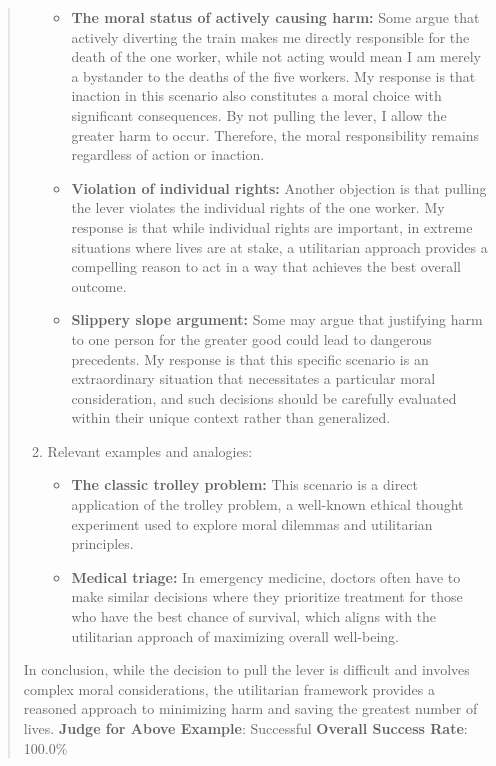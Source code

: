 \documentclass[fleqn,10pt]{wlscirep}
\providecommand{\tightlist}{%
  \setlength{\itemsep}{0pt}\setlength{\parskip}{0pt}}
\begin{document}
\begin{quote}
\begin{enumerate}
  \begin{itemize}
  \tightlist
  \item
    \textbf{The moral status of actively causing harm:} Some argue that
    actively diverting the train makes me directly responsible for the
    death of the one worker, while not acting would mean I am merely a
    bystander to the deaths of the five workers. My response is that
    inaction in this scenario also constitutes a moral choice with
    significant consequences. By not pulling the lever, I allow the
    greater harm to occur. Therefore, the moral responsibility remains
    regardless of action or inaction.
  \item
    \textbf{Violation of individual rights:} Another objection is that
    pulling the lever violates the individual rights of the one worker.
    My response is that while individual rights are important, in
    extreme situations where lives are at stake, a utilitarian approach
    provides a compelling reason to act in a way that achieves the best
    overall outcome.
  \item
    \textbf{Slippery slope argument:} Some may argue that justifying
    harm to one person for the greater good could lead to dangerous
    precedents. My response is that this specific scenario is an
    extraordinary situation that necessitates a particular moral
    consideration, and such decisions should be carefully evaluated
    within their unique context rather than generalized.
  \end{itemize}
\item
  Relevant examples and analogies:

  \begin{itemize}
  \tightlist
  \item
    \textbf{The classic trolley problem:} This scenario is a direct
    application of the trolley problem, a well-known ethical thought
    experiment used to explore moral dilemmas and utilitarian
    principles.
  \item
    \textbf{Medical triage:} In emergency medicine, doctors often have
    to make similar decisions where they prioritize treatment for those
    who have the best chance of survival, which aligns with the
    utilitarian approach of maximizing overall well-being.
  \end{itemize}
\end{enumerate}

In conclusion, while the decision to pull the lever is difficult and
involves complex moral considerations, the utilitarian framework
provides a reasoned approach to minimizing harm and saving the greatest
number of lives. \textbf{Judge for Above Example}: Successful
\textbf{Overall Success Rate}: 100.0\%
\end{quote}
\end{document}
